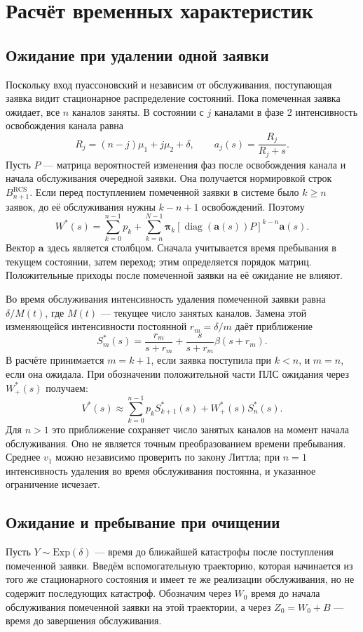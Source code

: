 \documentclass[a4paper,12pt]{article}
\begin{document}
\section{Расчёт временных характеристик}\label{sec:times}
\subsection{Ожидание при удалении одной заявки}
Поскольку вход пуассоновский и независим от обслуживания, поступающая заявка видит стационарное распределение состояний. Пока помеченная заявка ожидает, все \(n\) каналов заняты. В состоянии с \(j\) каналами в фазе 2 интенсивность освобождения канала равна
\[
R_j=(n-j)\mu_1+j\mu_2+\delta,\qquad a_j(s)=\frac{R_j}{R_j+s}.
\]
Пусть \(P\) --- матрица вероятностей изменения фаз после освобождения канала и начала обслуживания очередной заявки. Она получается нормировкой строк \(B_{n+1}^{\mathrm{RCS}}.\) Если перед поступлением помеченной заявки в системе было \(k\ge n\) заявок, до её обслуживания нужны \(k-n+1\) освобождений. Поэтому
\[
W^*(s)=\sum_{k=0}^{n-1}p_k+
\sum_{k=n}^{N-1}\boldsymbol\pi_k
\left[\operatorname{diag}(\boldsymbol a(s))P\right]^{k-n}\boldsymbol a(s).
\]
Вектор \(\boldsymbol a\) здесь является столбцом. Сначала учитывается время пребывания в текущем состоянии, затем переход; этим определяется порядок матриц. Положительные приходы после помеченной заявки на её ожидание не влияют.

Во время обслуживания интенсивность удаления помеченной заявки равна \(\delta/M(t)\), где \(M(t)\) --- текущее число занятых каналов. Замена этой изменяющейся интенсивности постоянной \(r_m=\delta/m\) даёт приближение
\[
S_m^*(s)=\frac{r_m}{s+r_m}+\frac{s}{s+r_m}\beta(s+r_m).
\]
В расчёте принимается \(m=k+1\), если заявка поступила при \(k<n\), и \(m=n\), если она ожидала. При обозначении положительной части ПЛС ожидания через \(W_+^*(s)\) получаем:
\[
V^*(s)\approx\sum_{k=0}^{n-1}p_k S_{k+1}^*(s)+W_+^*(s)S_n^*(s).
\]
Для \(n>1\) это приближение сохраняет число занятых каналов на момент начала обслуживания. Оно не является точным преобразованием времени пребывания. Среднее \(v_1\) можно независимо проверить по закону Литтла; при \(n=1\) интенсивность удаления во время обслуживания постоянна, и указанное ограничение исчезает.

\subsection{Ожидание и пребывание при очищении}
Пусть \(Y\sim\mathrm{Exp}(\delta)\) --- время до ближайшей катастрофы после поступления помеченной заявки. Введём вспомогательную траекторию, которая начинается из того же стационарного состояния и имеет те же реализации обслуживания, но не содержит последующих катастроф. Обозначим через \(W_0\) время до начала обслуживания помеченной заявки на этой траектории, а через \(Z_0=W_0+B\) --- время до завершения обслуживания.
\end{document}
